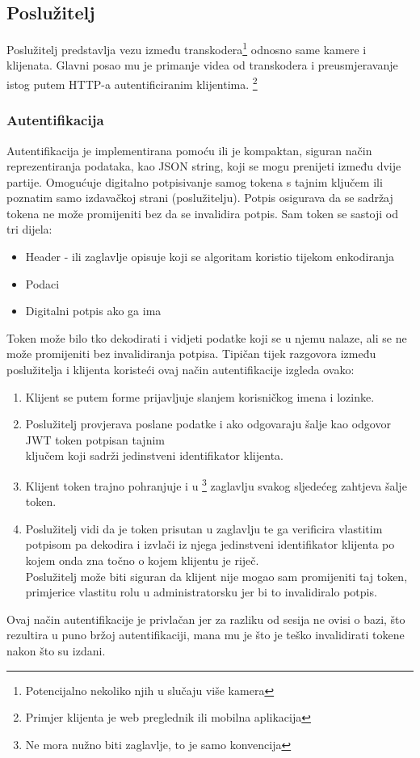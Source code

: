 \subsection{Poslužitelj}\label{sec:http_api}
Poslužitelj predstavlja vezu između transkodera\footnote{Potencijalno nekoliko njih u slučaju više kamera} odnosno same 
kamere i klijenata.
\paraBreak
Glavni posao mu je primanje videa od transkodera i preusmjeravanje istog putem HTTP-a autentificiranim klijentima.
\footnote{Primjer klijenta je web preglednik ili mobilna aplikacija}
\subsubsection{Autentifikacija}
Autentifikacija je implementirana pomoću  ili 
 \label{sec:jwt}
 je kompaktan, siguran način reprezentiranja podataka, kao JSON string, koji se mogu
prenijeti između dvije partije.
\paraBreak
Omogućuje digitalno potpisivanje samog tokena s tajnim ključem ili  poznatim samo izdavačkoj 
strani (poslužitelju). Potpis osigurava da se sadržaj tokena ne može promijeniti bez da se invalidira potpis. \cite{JWT}
\paraBreak
Sam token se sastoji od tri dijela:
\begin{itemize}
  \item Header - ili zaglavlje opisuje koji se algoritam koristio tijekom enkodiranja
  \item Podaci
  \item Digitalni potpis ako ga ima
\end{itemize}
Token može bilo tko dekodirati i vidjeti podatke koji se u njemu nalaze, ali se ne može promijeniti bez invalidiranja
potpisa. \cite{JWT}
\paraBreak
Tipičan tijek razgovora između poslužitelja i klijenta koristeći ovaj način autentifikacije izgleda ovako:
\begin{enumerate}
  \item Klijent se putem forme prijavljuje slanjem korisničkog imena i lozinke.
  \item Poslužitelj provjerava poslane podatke i ako odgovaraju šalje kao odgovor JWT token potpisan tajnim \\
  ključem koji sadrži jedinstveni identifikator klijenta.
  \item Klijent token trajno pohranjuje i u  
    \footnote{Ne mora nužno biti  zaglavlje, to je samo konvencija} 
    zaglavlju svakog sljedećeg zahtjeva
    šalje token.
  \item Poslužitelj vidi da je token prisutan u zaglavlju te ga verificira vlastitim potpisom pa dekodira i izvlači iz 
    njega jedinstveni identifikator klijenta po kojem onda zna točno o kojem klijentu je riječ. \\
    Poslužitelj može biti siguran da klijent nije mogao sam promijeniti taj token, primjerice vlastitu rolu u 
    administratorsku jer bi to invalidiralo potpis.
\end{enumerate}
Ovaj način autentifikacije je privlačan jer za razliku od sesija ne ovisi o bazi, što rezultira u puno bržoj 
autentifikaciji, mana mu je što je teško invalidirati tokene nakon što su izdani. \cite{JWT}

